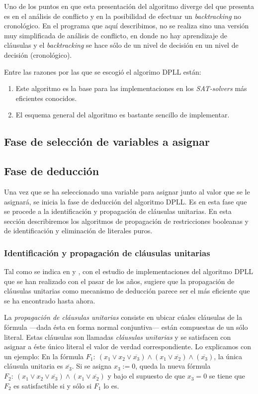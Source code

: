 \documentclass[12pt,lettersize]{article}
\begin{document}
Uno de los puntos en que esta presentación del algoritmo diverge del que
presenta \cite{Zhang} es en el análisis de conflicto y en la posibilidad de
efectuar un \emph{backtracking} no cronológico. En el programa que aquí
describimos, no se realiza sino una versión muy simplificada de análisis de
conflicto, en donde no hay aprendizaje de cláusulas y el \emph{backtracking} se
hace sólo de un nivel de decisión en un nivel de decisión (cronológico).

Entre las razones por las que se escogió el algorimo DPLL están:
\begin{enumerate}
\item Este algoritmo es la base para las implementaciones en los
  \emph{SAT-solvers} más eficientes conocidos.
\item El esquema general del algoritmo es bastante sencillo de implementar.
\end{enumerate}
\subsection{Fase de selección de variables a asignar}

\subsection{Fase de deducción}

Una vez que se ha seleccionado una variable para asignar junto al valor que se
le asignará, se inicia la fase de deducción del algoritmo DPLL. Es en esta fase
que se procede a la identificación y propagación de cláusulas unitarias. En esta
sección describiremos los algoritmos de propagación de restricciones booleanas y
de identificación y eliminación de literales puros.


\subsubsection{Identificación y propagación de cláusulas
  unitarias}\label{UnitPropagation}
Tal como se indica en \cite{Zhang} y \cite{ZhangThesis}, con el estudio de
implementaciones del algoritmo DPLL que se han realizado con el pasar de los
años, sugiere que la propagación de cláusulas unitarias como mecanismo de
deducción parece ser el más eficiente que se ha encontrado hasta ahora.

La \emph{propagación de cláusulas unitarias} consiste en ubicar cúales cláusulas
de la fórmula ---dada ésta en forma normal conjuntiva--- están compuestas de un
sólo literal. Estas cláusulas son llamadas \emph{cláusulas unitarias} y se
satisfacen con asignar a éste único literal el valor de verdad correspondiente.
Lo explicamos con un ejemplo: En la fórmula $F_1:\ (x_1 \vee x_2 \vee
\overline{x_3}) \wedge (x_1 \vee \overline{x_2}) \wedge (\overline{x_3})$, la
única cláusula unitaria es $\overline{x_3}$. Si se asigna $x_3:=0$, queda la
nueva fórmula $F_2:\ (x_1 \vee x_2 \vee \overline{x_3}) \wedge (x_1 \vee
\overline{x_2}) $ y bajo el supuesto de que $x_3=0$ se tiene que $F_2$ es
satisfactible si y sólo si $F_1$ lo es.
\end{document}
